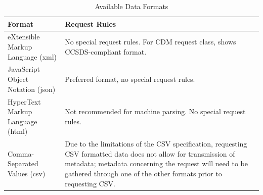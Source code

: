 \documentclass[12pt]{article}
\begin{document}
\begin{table}[H]\singlespacing
	\caption{Available Data Formats\cite{SpaceTrackAPI}}
	\label{tab:dataFormat}
	\begin{tabular}{|l|p{9cm}|}
		\hline
		Format                             & Request Rules                                                                                                                                                                                                                                                                                                                                                                                                                                                                             \\ \hline
		eXtensible Markup Language (xml)  & No special request rules. For CDM request class, shows CCSDS-compliant format.                                                                                                                                                                                                                                                                                                                                                                                                            \\ \hline
		JavaScript Object Notation (json) & Preferred format, no special request rules.                                                                                                                                                                                                                                                                                                                                                                                                                                               \\ \hline
		HyperText Markup Language (html)  & Not recommended for machine parsing. No special request rules.                                                                                                                                                                                                                                                                                                                                                                                                                            \\ \hline
		Comma-Separated Values (csv)      & Due to the limitations of the CSV specification, requesting CSV formatted data does not allow for transmission of metadata; metadata concerning the request will need to be gathered through one of the other formats prior to requesting CSV.                                                                                                                                                                                                                                            \\ \hline

\end{tabular}
\end{table}
\end{document}
